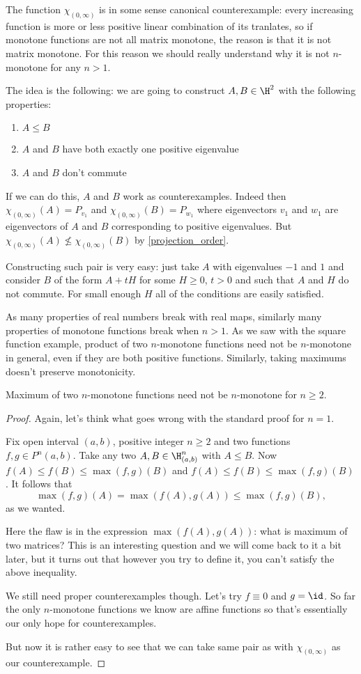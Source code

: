 The function $\chi_{(0, \infty)}$ is in some sense canonical counterexample: every increasing function is more or less positive linear combination of its tranlates, so if monotone functions are not all matrix monotone, the reason is that it is not matrix monotone. For this reason we should really understand why it is not $n$-monotone for any $n > 1$.

The idea is the following: we are going to construct $A, B \in \H^{2}$ with the following properties:
\begin{enumerate}
	\item $A \leq B$
	\item $A$ and $B$ have both exactly one positive eigenvalue
	\item $A$ and $B$ don't commute
\end{enumerate}
If we can do this, $A$ and $B$ work as counterexamples. Indeed then $\chi_{(0, \infty)}(A) = P_{v_{1}}$ and $\chi_{(0, \infty)}(B) = P_{w_{1}}$ where eigenvectors $v_{1}$ and $w_{1}$ are eigenvectors of $A$ and $B$ corresponding to positive eigenvalues. But $\chi_{(0, \infty)}(A) \not\leq \chi_{(0, \infty)}(B)$ by \ref{projection_order}.

Constructing such pair is very easy: just take $A$ with eigenvalues $-1$ and $1$ and consider $B$ of the form $A + t H$ for some $H \geq 0$, $t > 0$ and such that $A$ and $H$ do not commute. For small enough $H$ all of the conditions are easily satisfied.

As many properties of real numbers break with real maps, similarly many properties of monotone functions break when $n > 1$. As we saw with the square function example, product of two $n$-monotone functions need not be $n$-monotone in general, even if they are both positive functions. Similarly, taking maximums doesn't preserve monotonicity.

\begin{prop}
	Maximum of two $n$-monotone functions need not be $n$-monotone for $n \geq 2$.
\end{prop}
\begin{proof}
	Again, let's think what goes wrong with the standard proof for $n = 1$.

	Fix open interval $(a, b)$, positive integer $n \geq 2$ and two functions $f, g \in P^{n}(a, b)$. Take any two $A, B \in \H_{(a, b)}^{n}$ with $A \leq B$. Now $f(A) \leq f(B) \leq \max(f, g)(B)$ and $f(A) \leq f(B) \leq \max(f, g)(B)$. It follows that
	\[
		\max(f, g)(A) = \max(f(A), g(A)) \leq \max(f, g)(B),
	\]
	as we wanted.

	Here the flaw is in the expression $\max(f(A), g(A))$: what is maximum of two matrices? This is an interesting question and we will come back to it a bit later, but it turns out that however you try to define it, you can't satisfy the above inequality.

	We still need proper counterexamples though. Let's try $f \equiv 0$ and $g = \id$. So far the only $n$-monotone functions we know are affine functions so that's essentially our only hope for counterexamples.

	But now it is rather easy to see that we can take same pair as with $\chi_{(0, \infty)}$ as our counterexample.
\end{proof}

